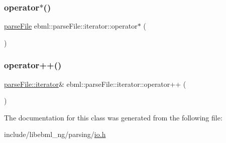 \subsubsection{\texorpdfstring{operator$\ast$()}{operator*()}}
{\footnotesize\ttfamily \mbox{\hyperlink{classebml_1_1parseFile}{parse\+File}} ebml\+::parse\+File\+::iterator\+::operator$\ast$ (\begin{DoxyParamCaption}{ }\end{DoxyParamCaption})}

\mbox{\label{classebml_1_1parseFile_1_1iterator_aa96daedba0d43670d9760777c0fd8916}} 
\subsubsection{\texorpdfstring{operator++()}{operator++()}}
{\footnotesize\ttfamily \mbox{\hyperlink{classebml_1_1parseFile_1_1iterator}{parse\+File\+::iterator}}\& ebml\+::parse\+File\+::iterator\+::operator++ (\begin{DoxyParamCaption}{ }\end{DoxyParamCaption})}



The documentation for this class was generated from the following file\+:\begin{DoxyCompactItemize}
\item 
include/libebml\+\_\+ng/parsing/\mbox{\hyperlink{parsing_2io_8h}{io.\+h}}\end{DoxyCompactItemize}
